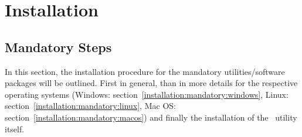 
\chapter{Installation}
	\label{appendix:chap:installation}
	\section{Mandatory Steps}
		In this section, the installation procedure for the mandatory utilities/software packages will be outlined. First in general, than in more details for the respective operating systems (\mbox{Windows}: \mbox{section \ref{installation:mandatory:windows}}, Linux: \mbox{section \ref{installation:mandatory:linux}}, Mac OS: \mbox{section \ref{installation:mandatory:macos}}) and finally the installation of the \mbox{\productName}~utility itself.
		
